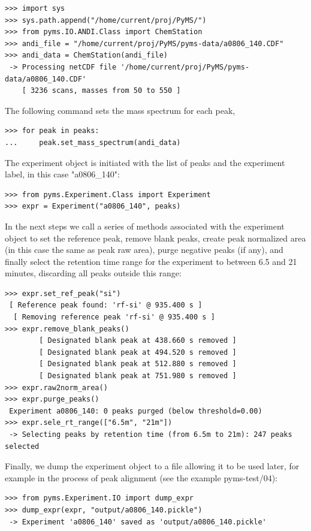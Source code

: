 \begin{verbatim}
>>> import sys
>>> sys.path.append("/home/current/proj/PyMS/")
>>> from pyms.IO.ANDI.Class import ChemStation
>>> andi_file = "/home/current/proj/PyMS/pyms-data/a0806_140.CDF"
>>> andi_data = ChemStation(andi_file)
 -> Processing netCDF file '/home/current/proj/PyMS/pyms-data/a0806_140.CDF'
    [ 3236 scans, masses from 50 to 550 ]
\end{verbatim}

\noindent
The following command sets the mass spectrum for each peak,

\begin{verbatim}
>>> for peak in peaks:
...     peak.set_mass_spectrum(andi_data)
\end{verbatim}

The experiment object is initiated with the list of peaks and the experiment
label, in this case "a0806\_140":

\begin{verbatim}
>>> from pyms.Experiment.Class import Experiment
>>> expr = Experiment("a0806_140", peaks)
\end{verbatim}

\noindent
In the next steps we call a series of methods associated with the experiment
object to set the reference peak, remove blank peaks, create peak normalized
area (in this case the same as peak raw area), purge negative peaks (if
any), and finally select the retention time range for the experiment to
between 6.5 and 21 minutes, discarding all peaks outside this range:

\begin{verbatim}
>>> expr.set_ref_peak("si")
 [ Reference peak found: 'rf-si' @ 935.400 s ]
  [ Removing reference peak 'rf-si' @ 935.400 s ]
>>> expr.remove_blank_peaks()
        [ Designated blank peak at 438.660 s removed ]
        [ Designated blank peak at 494.520 s removed ]
        [ Designated blank peak at 512.880 s removed ]
        [ Designated blank peak at 751.980 s removed ]
>>> expr.raw2norm_area()
>>> expr.purge_peaks()
 Experiment a0806_140: 0 peaks purged (below threshold=0.00)
>>> expr.sele_rt_range(["6.5m", "21m"])
 -> Selecting peaks by retention time (from 6.5m to 21m): 247 peaks selected
\end{verbatim}

Finally, we dump the experiment object to a file allowing it to be used
later, for example in the process of peak alignment (see the example
pyms-test/04):

\begin{verbatim}
>>> from pyms.Experiment.IO import dump_expr
>>> dump_expr(expr, "output/a0806_140.pickle")
 -> Experiment 'a0806_140' saved as 'output/a0806_140.pickle'
\end{verbatim}

